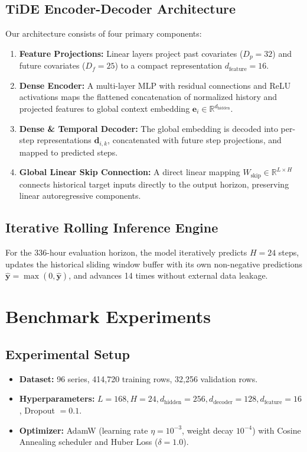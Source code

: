 \documentclass[11pt,a4paper]{article}
\begin{document}
\subsection{TiDE Encoder-Decoder Architecture}
Our architecture consists of four primary components:
\begin{enumerate}
    \item \textbf{Feature Projections:} Linear layers project past covariates ($D_p = 32$) and future covariates ($D_f = 25$) to a compact representation $d_{\text{feature}} = 16$.
    \item \textbf{Dense Encoder:} A multi-layer MLP with residual connections and ReLU activations maps the flattened concatenation of normalized history and projected features to global context embedding $\mathbf{e}_i \in \mathbb{R}^{d_{\text{hidden}}}$.
    \item \textbf{Dense \& Temporal Decoder:} The global embedding is decoded into per-step representations $\mathbf{d}_{i, k}$, concatenated with future step projections, and mapped to predicted steps.
    \item \textbf{Global Linear Skip Connection:} A direct linear mapping $W_{\text{skip}} \in \mathbb{R}^{L \times H}$ connects historical target inputs directly to the output horizon, preserving linear autoregressive components.
\end{enumerate}

\subsection{Iterative Rolling Inference Engine}
For the 336-hour evaluation horizon, the model iteratively predicts $H = 24$ steps, updates the historical sliding window buffer with its own non-negative predictions $\hat{\mathbf{y}} = \max(0, \hat{\mathbf{y}})$, and advances 14 times without external data leakage.

\section{Benchmark Experiments}

\subsection{Experimental Setup}
\begin{itemize}
    \item \textbf{Dataset:} 96 series, 414,720 training rows, 32,256 validation rows.
    \item \textbf{Hyperparameters:} $L = 168, H = 24, d_{\text{hidden}} = 256, d_{\text{decoder}} = 128, d_{\text{feature}} = 16$, Dropout $= 0.1$.
    \item \textbf{Optimizer:} AdamW (learning rate $\eta = 10^{-3}$, weight decay $10^{-4}$) with Cosine Annealing scheduler and Huber Loss ($\delta = 1.0$).
\end{itemize}
\end{document}
